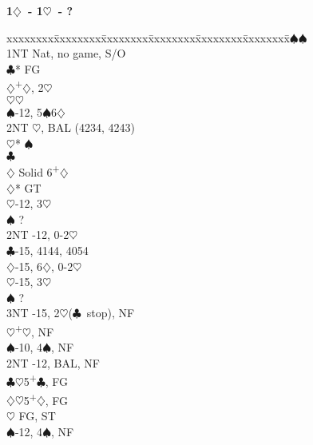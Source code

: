 \documentclass[10pt]{article}
\renewcommand{\c}{$\clubsuit$}
\renewcommand{\d}{$\diamondsuit$}
\newcommand{\h}{$\heartsuit$}
\newcommand{\s}{$\spadesuit$}
\newcommand{\p}{\textsuperscript{+}}
\newcommand{\m}{\textsuperscript{\textminus}}
\newenvironment{bidtable}[1][]
{\textbf{#1}
  \begin{adjustwidth}{1em}{}
    \addvspace{2pt}
    \begin{tabbing}
      xxxxxxxx\=xxxxxxxx\=xxxxxxxx\=xxxxxxxx\=xxxxxxxx\=xxxxxxxx\=\kill}
{\end{tabbing}\end{adjustwidth}\bigskip}%
\begin{document}
\begin{multicols*}{2}
\begin{bidtable}[1\d\ - 1\h\ - ?]
1\s  {}\s                                             \\
     \> 1NT  \> Nat, no game, S/O                       \\
     \c* \> FG                                      \\
     \>      \d {}\p\d, 2\m\h                     \\
     \>      \h {}\h                              \\
     \>      \s {}-12, 5\s 6\d                   \\
     \>      \> 2NT \h, BAL (4234, 4243)      \\
     \>      \>     \h* {}\s                      \\
     \>      \c {}\\
     \>      \d \> Solid 6\p\d                      \\
     \d* \> GT                                      \\
     \>      \h {}-12, 3\h                       \\
     \>      \s \> ?                                \\
     \>      \> 2NT -12, 0-2\h                     \\
     \>      \c {}-15, 4144, 4054                \\
     \>      \d {}-15, 6\d, 0-2\h                \\
     \>      \h {}-15, 3\h                       \\
     \>      \s \> ?                                \\
     \>      \> 3NT -15, 2\h (\c\ stop), NF        \\
     \h  {}\p\h, NF                               \\
     \s  {}-10, 4\s, NF                           \\
     \> 2NT  -12, BAL, NF                          \\
     \c  {}\h 5\p\c, FG                           \\
     \d  {}\h 5\p\d, FG                           \\
     \h  \> FG, ST                                  \\
     \s  {}-12, 4\s, NF                          \\

\end{bidtable}
\end{multicols*}
\end{document}

